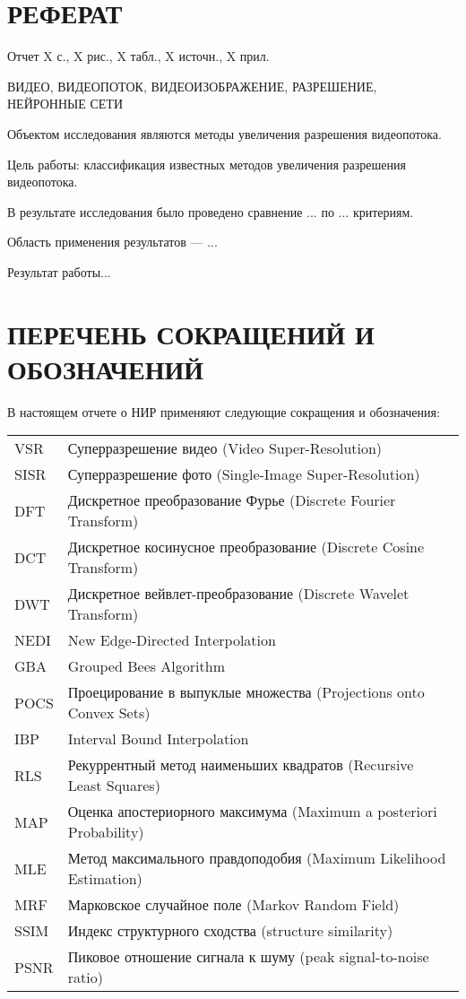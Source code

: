 \documentclass{bmstu}
\begin{document}


\setcounter{page}{3}

{\centering \chapter*{РЕФЕРАТ}}

Отчет X с., X рис., X табл., X источн., X прил.

\noindent ВИДЕО, ВИДЕОПОТОК, ВИДЕОИЗОБРАЖЕНИЕ, РАЗРЕШЕНИЕ, НЕЙРОННЫЕ СЕТИ

Объектом исследования являются методы увеличения разрешения видеопотока.

Цель работы: классификация известных методов увеличения разрешения видеопотока.

В результате исследования было проведено сравнение ... по ... критериям.

Область применения результатов --- ...

Результат работы...

\maketableofcontents

{\centering \chapter*{ПЕРЕЧЕНЬ СОКРАЩЕНИЙ И ОБОЗНАЧЕНИЙ}}

В настоящем отчете о НИР применяют следующие сокращения и обозначения:

\begin{table}[H]
\begin{tabular}{p{3cm}p{13.5cm}}
VSR & Суперразрешение видео (Video Super-Resolution)
\tabularnewline
SISR & Суперразрешение фото (Single-Image Super-Resolution)
\tabularnewline
DFT & Дискретное преобразование Фурье (Discrete Fourier Transform)
\tabularnewline
DCT & Дискретное косинусное преобразование (Discrete Cosine Transform)
\tabularnewline
DWT & Дискретное вейвлет-преобразование (Discrete Wavelet Transform)
\tabularnewline
NEDI & New Edge-Directed Interpolation
\tabularnewline
GBA & Grouped Bees Algorithm
\tabularnewline
POCS & Проецирование в выпуклые множества (Projections onto Convex Sets)
\tabularnewline
IBP & Interval Bound Interpolation
\tabularnewline
RLS & Рекуррентный метод наименьших квадратов (Recursive Least Squares)
\tabularnewline
MAP & Оценка апостериорного максимума (Maximum a posteriori Probability)
\tabularnewline
MLE & Метод максимального правдоподобия (Maximum Likelihood Estimation)
\tabularnewline
MRF & Марковское случайное поле (Markov Random Field)
\tabularnewline
SSIM & Индекс структурного сходства (structure similarity)
\tabularnewline
PSNR & Пиковое отношение сигнала к шуму (peak signal-to-noise ratio)
\tabularnewline
\end{tabular}
\end{table}
\end{document}

